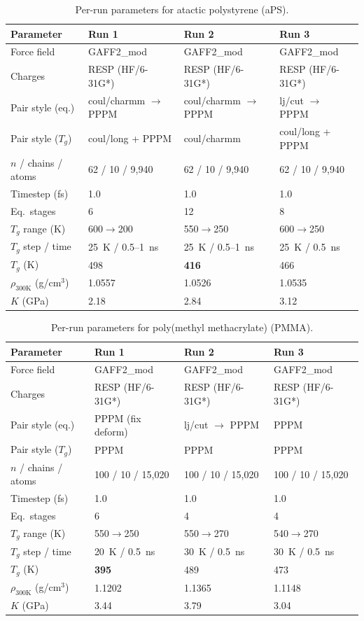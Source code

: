 \documentclass[journal=acsami,manuscript=suppinfo]{achemso}
\begin{document}
\begin{table}[H]
\centering
\caption{Per-run parameters for atactic polystyrene (aPS).}
\label{tab:si_aps_params}
\small
\begin{tabular}{llll}
\toprule
\textbf{Parameter} & \textbf{Run 1} & \textbf{Run 2} & \textbf{Run 3} \\
\midrule
Force field & GAFF2\_mod & GAFF2\_mod & GAFF2\_mod \\
Charges & RESP (HF/6-31G*) & RESP (HF/6-31G*) & RESP (HF/6-31G*) \\
Pair style (eq.) & coul/charmm $\to$ PPPM & coul/charmm $\to$ PPPM & lj/cut $\to$ PPPM \\
Pair style ($T_g$) & coul/long + PPPM & coul/charmm & coul/long + PPPM \\
$n$ / chains / atoms & 62 / 10 / 9{,}940 & 62 / 10 / 9{,}940 & 62 / 10 / 9{,}940 \\
Timestep (fs) & 1.0 & 1.0 & 1.0 \\
Eq.\ stages & 6 & 12 & 8 \\
$T_g$ range (K) & 600$\to$200 & 550$\to$250 & 600$\to$250 \\
$T_g$ step / time & 25~K / 0.5--1~ns & 25~K / 0.5--1~ns & 25~K / 0.5~ns \\
\midrule
$T_g$ (K) & 498 & \textbf{416} & 466 \\
$\rho_{300\text{K}}$ (g/cm$^3$) & 1.0557 & 1.0526 & 1.0535 \\
$K$ (GPa) & 2.18 & 2.84 & 3.12 \\
\bottomrule
\end{tabular}
\end{table}

\begin{table}[H]
\centering
\caption{Per-run parameters for poly(methyl methacrylate) (PMMA).}
\label{tab:si_pmma_params}
\small
\begin{tabular}{llll}
\toprule
\textbf{Parameter} & \textbf{Run 1} & \textbf{Run 2} & \textbf{Run 3} \\
\midrule
Force field & GAFF2\_mod & GAFF2\_mod & GAFF2\_mod \\
Charges & RESP (HF/6-31G*) & RESP (HF/6-31G*) & RESP (HF/6-31G*) \\
Pair style (eq.) & PPPM (fix deform) & lj/cut $\to$ PPPM & PPPM \\
Pair style ($T_g$) & PPPM & PPPM & PPPM \\
$n$ / chains / atoms & 100 / 10 / 15{,}020 & 100 / 10 / 15{,}020 & 100 / 10 / 15{,}020 \\
Timestep (fs) & 1.0 & 1.0 & 1.0 \\
Eq.\ stages & 6 & 4 & 4 \\
$T_g$ range (K) & 550$\to$250 & 550$\to$270 & 540$\to$270 \\
$T_g$ step / time & 20~K / 0.5~ns & 30~K / 0.5~ns & 30~K / 0.5~ns \\
\midrule
$T_g$ (K) & \textbf{395} & 489 & 473 \\
$\rho_{300\text{K}}$ (g/cm$^3$) & 1.1202 & 1.1365 & 1.1148 \\
$K$ (GPa) & 3.44 & 3.79 & 3.04 \\
\bottomrule
\end{tabular}
\end{table}
\end{document}
